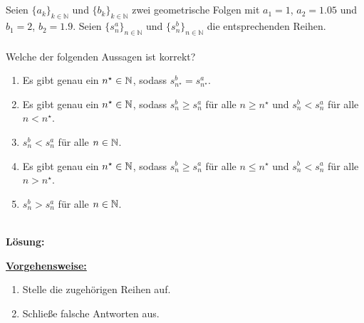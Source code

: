 \subsection*{}
Seien $\{a_k\}_{k \in \mathbb{N}}$ und $\{b_k\}_{k \in \mathbb{N}}$ zwei geometrische Folgen mit $a_1 = 1$, $a_2= 1.05$ und $b_1 = 2$, $b_2 = 1.9$. Seien $\{s_n^a \}_{n \in \mathbb{N}}$ und $\{s_n^b \}_{n \in \mathbb{N}}$ die entsprechenden Reihen.\\
\\
Welche der folgenden Aussagen ist korrekt?
\renewcommand{\labelenumi}{(\alph{enumi})}
\begin{enumerate}
	\item 
	Es gibt genau ein $n^\star \in \mathbb{N}$, sodass $s^b_{n^\star} = s^a_{n^\star} $.
	\item 
	Es gibt genau ein $n^\star \in \mathbb{N}$, sodass $s^b_n \geq s_n^a$ für alle $n \geq n^\star$ und $s_n^b < s_n^a$ für alle $n < n^\star$.
	\item 
	$s_n^b < s_n^a$ für alle $n \in \mathbb{N}$.
	\item
	Es gibt genau ein $n^\star \in \mathbb{N}$, sodass $s_n^b \geq s_n^a$ für alle $n \leq n^\star$ und $s_n^b < s_n^a$ für alle $n > n^\star$.
	\item 
	$s_n^b > s_n^a$ für alle $n \in \mathbb{N}$.
\end{enumerate}
\ \\
\textbf{Lösung:}
\begin{mdframed}
\underline{\textbf{Vorgehensweise:}}
\renewcommand{\labelenumi}{\theenumi.}
\begin{enumerate}
\item Stelle die zugehörigen Reihen auf.
\item Schließe falsche Antworten aus.
\end{enumerate}
\end{mdframed}

